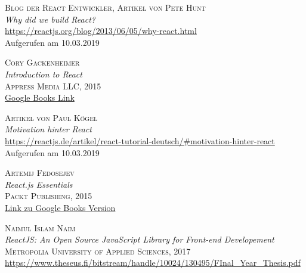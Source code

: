 \documentclass[twoside,12pt,a4paper]{report}
\begin{document}

\begin{thebibliography}{9}

  \textsc{Blog der React Entwickler, Artikel von Pete Hunt}\\
  \textit{Why did we build React?}\\
  \href{https://reactjs.org/blog/2013/06/05/why-react.html}{https://reactjs.org/blog/2013/06/05/why-react.html}\\
  Aufgerufen am 10.03.2019

  \textsc{Cory Gackenheimer}\\
  \textit{Introduction to React}\\
  \textsc{Appress Media LLC, 2015}\\
  \href{https://books.google.de/books?hl=de&lr=&id=NZCKCgAAQBAJ&oi=fnd&pg=PR6&dq=react+javascript&ots=KAvyPmyx-e&sig=vmxw0RuGUAADmEc_vZTL4VakTnE#v=onepage&q=react%20javascript&f=false}{Google Books Link}

  \textsc{Artikel von Paul Kögel}\\
  \textit{Motivation hinter React}\\
  \href{https://reactjs.de/artikel/react-tutorial-deutsch/#motivation-hinter-react}{https://reactjs.de/artikel/react-tutorial-deutsch/\#motivation-hinter-react}\\
  Aufgerufen am 10.03.2019

  \textsc{Artemij Fedosejev}\\
  \textit{React.js Essentials}\\
  \textsc{Packt Publishing, 2015}\\
  \href{https://books.google.de/books?hl=de&lr=&id=Rhl1CgAAQBAJ&oi=fnd&pg=PP1&dq=react+javascript&ots=JjvymzwSMG&sig=V3PsDnRjBuwxrtUaRyrYVkB6Ffk#v=onepage&q=react%20javascript&f=false}{Link zu Google Books Version}

  \textsc{Naimul Islam Naim}\\
  \textit{ReactJS:  An  Open  Source  JavaScript  Library for Front-end Developement}\\
  \textsc{Metropolia University of Applied Sciences, 2017}\\
  \href{https://www.theseus.fi/bitstream/handle/10024/130495/FInal_Year_Thesis.pdf}{https://www.theseus.fi/bitstream/handle/10024/130495/FInal\_Year\_Thesis.pdf}


\end{thebibliography}
\end{document}
